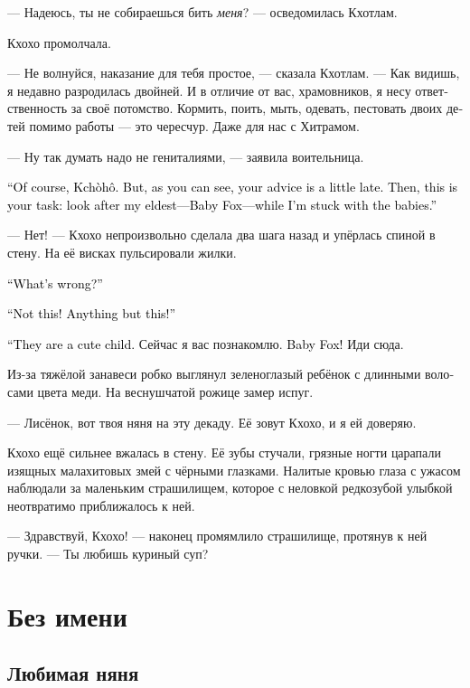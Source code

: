 \documentclass[a4paper,12pt,fleqn]{book}\usepackage{cooltooltips}\usepackage{polyglossia}\setdefaultlanguage{russian}\setotherlanguage{english}\defaultfontfeatures{Ligatures=TeX,Mapping=tex-text} \usepackage{xcolor}\definecolor{lightgray}{HTML}{bbbbbb}\color{lightgray}\newcommand{\ml}[3]{\textenglish{\textcolor{black}{#3}}}
\newcommand{\Kchoho}{Kch\`{o}h\^{o}}
\begin{document}
--- Надеюсь, ты не собираешься бить \emph{меня}? --- осведомилась Кхотлам.

Кхохо промолчала.

--- Не волнуйся, наказание для тебя простое, --- сказала Кхотлам.
--- Как видишь, я недавно разродилась двойней.
И в отличие от вас, храмовников, я несу ответственность за своё потомство.
Кормить, поить, мыть, одевать, пестовать двоих детей помимо работы --- это чересчур.
Даже для нас с Хитрамом.

--- Ну так думать надо не гениталиями, --- заявила воительница.

\ml{$0$}
{--- Безусловно, Кхохо.}
{``Of course, \Kchoho.}
\ml{$0$}
{Но твой совет, как видишь, немного запоздал.}
{But, as you can see, your advice is a little late.}
\ml{$0$}
{Поэтому вот тебе задание --- посмотри за моим старшеньким, за Лисёнком, пока я занимаюсь малышами.}
{Then, this is your task: look after my eldest---Baby Fox---while I'm stuck with the babies.''}

--- Нет! --- Кхохо непроизвольно сделала два шага назад и упёрлась спиной в стену.
На её висках пульсировали жилки.

\ml{$0$}
{--- Что такое?}
{``What's wrong?''}

\ml{$0$}
{--- Нет!}
{``Not this!}
\ml{$0$}
{Только не это!}
{Anything but this!''}

\ml{$0$}
{--- Он очень милый малыш.}
{``They are a cute child.}
Сейчас я вас познакомлю.
\ml{$0$}
{Лисёнок!}
{Baby Fox!}
Иди сюда.

Из-за тяжёлой занавеси робко выглянул зеленоглазый ребёнок с длинными волосами цвета меди.
На веснушчатой рожице замер испуг.

--- Лисёнок, вот твоя няня на эту декаду.
Её зовут Кхохо, и я ей доверяю.

Кхохо ещё сильнее вжалась в стену.
Её зубы стучали, грязные ногти царапали изящных малахитовых змей с чёрными глазками.
Налитые кровью глаза с ужасом наблюдали за маленьким страшилищем, которое с неловкой редкозубой улыбкой неотвратимо приближалось к ней.

--- Здравствуй, Кхохо! --- наконец промямлило страшилище, протянув к ней ручки.
--- Ты любишь куриный суп?

\chapter{Без имени}

\section{Любимая няня}
\end{document}
